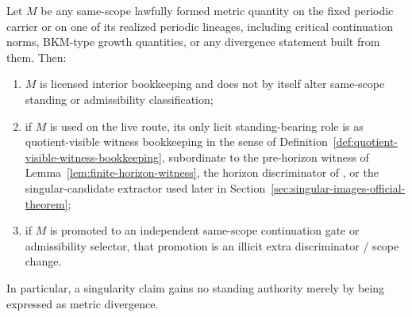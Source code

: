 \begin{manualproposition}
\label{prop:metric-divergence-skin-non-authority}
Let $M$ be any same-scope lawfully formed metric quantity on the fixed periodic carrier or on one of its realized periodic lineages, including critical continuation norms, BKM-type growth quantities, or any divergence statement built from them. Then:
\begin{enumerate}[label=(\roman*), leftmargin=2.2em]
\item $M$ is licensed interior bookkeeping and does not by itself alter same-scope standing or admissibility classification;
\item if $M$ is used on the live route, its only licit standing-bearing role is as quotient-visible witness bookkeeping in the sense of Definition~\ref{def:quotient-visible-witness-bookkeeping}, subordinate to the pre-horizon witness of Lemma~\ref{lem:finite-horizon-witness}, the horizon discriminator of \HorizonDetectabilityRef{}, or the singular-candidate extractor used later in Section~\ref{sec:singular-images-official-theorem};
\item if $M$ is promoted to an independent same-scope continuation gate or admissibility selector, that promotion is an illicit extra discriminator / scope change.
\end{enumerate}
In particular, a singularity claim gains no standing authority merely by being expressed as metric divergence.
\end{manualproposition}

